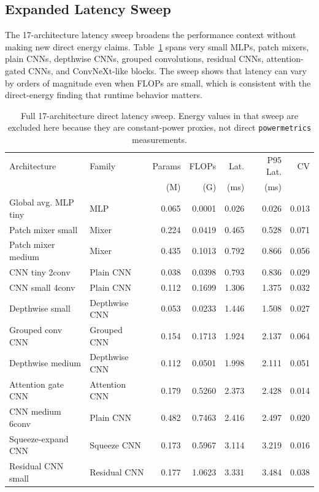 \documentclass[conference]{IEEEtran}
\begin{document}
\subsection{Expanded Latency Sweep}

The 17-architecture latency sweep broadens the performance context without
making new direct energy claims. Table~\ref{tab:latency-sweep} spans very
small MLPs, patch mixers, plain CNNs, depthwise CNNs, grouped convolutions,
residual CNNs, attention-gated CNNs, and ConvNeXt-like blocks. The sweep shows
that latency can vary by orders of magnitude even when FLOPs are small, which
is consistent with the direct-energy finding that runtime behavior matters.

\begin{table}[t]
\centering
\caption{Full 17-architecture direct latency sweep. Energy values in
that sweep are excluded here because they are constant-power proxies, not
direct \texttt{powermetrics} measurements.}
\label{tab:latency-sweep}
\scriptsize
\begin{tabular}{llrrrrr}
\toprule
Architecture & Family & Params & FLOPs & Lat. & P95 Lat. & CV\\
 & & (M) & (G) & (ms) & (ms) & \\
\midrule
Global avg. MLP tiny & MLP & 0.065 & 0.0001 & 0.026 & 0.026 & 0.013\\
Patch mixer small & Mixer & 0.224 & 0.0419 & 0.465 & 0.528 & 0.071\\
Patch mixer medium & Mixer & 0.435 & 0.1013 & 0.792 & 0.866 & 0.056\\
CNN tiny 2conv & Plain CNN & 0.038 & 0.0398 & 0.793 & 0.836 & 0.029\\
CNN small 4conv & Plain CNN & 0.112 & 0.1699 & 1.306 & 1.375 & 0.032\\
Depthwise small & Depthwise CNN & 0.053 & 0.0233 & 1.446 & 1.508 & 0.027\\
Grouped conv CNN & Grouped CNN & 0.154 & 0.1713 & 1.924 & 2.137 & 0.064\\
Depthwise medium & Depthwise CNN & 0.112 & 0.0501 & 1.998 & 2.111 & 0.051\\
Attention gate CNN & Attention CNN & 0.179 & 0.5260 & 2.373 & 2.428 & 0.014\\
CNN medium 6conv & Plain CNN & 0.482 & 0.7463 & 2.416 & 2.497 & 0.020\\
Squeeze-expand CNN & Squeeze CNN & 0.173 & 0.5967 & 3.114 & 3.219 & 0.016\\
Residual CNN small & Residual CNN & 0.177 & 1.0623 & 3.331 & 3.484 & 0.038\\

\end{tabular}
\end{table}
\end{document}
